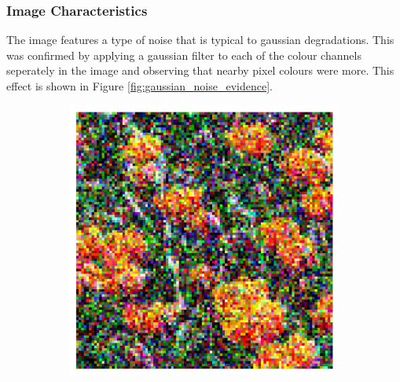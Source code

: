 \documentclass[11pt]{article}
\begin{document}
\subsubsection{Image Characteristics}
The image features a type of noise that is typical to gaussian degradations. This was confirmed by applying a gaussian filter to each of the colour channels seperately in the image and observing that nearby pixel colours were more. This effect is shown in Figure \ref{fig:gaussian_noise_evidence}. 
\begin{figure}[H]
    \centering
    \begin{subfigure}{.4\textwidth}
        \centering
        \includegraphics[width=\linewidth]{figs/q1b_patch.png}  %
        \caption{}
        \label{fig:flower_patch}
    \end{subfigure}%
    \begin{subfigure}{.4\textwidth}
        \centering

\end{subfigure}
\end{figure}
\end{document}
